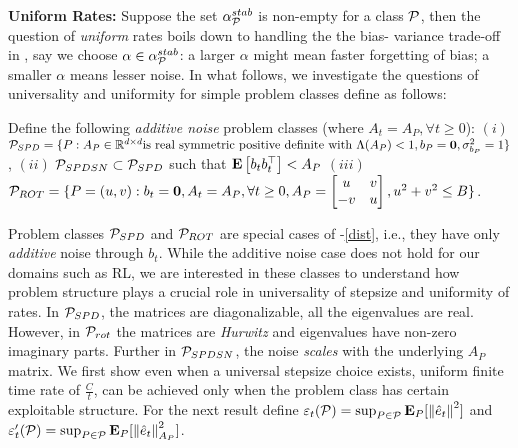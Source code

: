 \textbf{Uniform Rates:} Suppose the set $\alpha^{stab}_{\P}$ is non-empty for a class $\P$, then the question of \emph{uniform} rates boils down to handling the the bias-
variance trade-off in , say we choose $\alpha\in\alpha^{stab}_{\P}$: a larger $\alpha$ might mean faster forgetting of bias; a smaller $\alpha$ means lesser noise. In what follows, we investigate the questions of universality and uniformity for simple problem classes define as follows:
\begin{definition}
Define the following \emph{additive noise} problem classes (where $A_t=A_P,\forall t\geq 0$): $(i)$  $\P_{SPD}=\{ P: A_P\in \R^{\dcd}\text{is real symmetric positive definite with~} \Lambda(A_P)<1, b_P=\mathbf{0}, \sigma^2_{b_P}=1\}$, $(ii)$ $\P_{SPDSN}\subset \P_{SPD}$ such that $\EE{b_tb_t^\top}<A_P$ $(iii)$ $\P_{ROT}=\{P=(u,v): b_t=\mathbf{0}, A_t=A_P, \forall t\geq 0, A_P=\left[\begin{matrix} u &v \\ -v & u\end{matrix}\right], u^2+v^2\leq B\}$.
\end{definition}
Problem classes $\P_{SPD}$ and $\P_{ROT}$ are special cases of -\eqref{dist}, i.e., they have only \emph{additive} noise through $b_t$. While the additive noise case does not hold for our domains such as RL, we are interested in these classes to understand how problem structure plays a crucial role in universality of stepsize and uniformity of rates. In $\P_{SPD}$, the matrices are diagonalizable, all the eigenvalues are real. However, in $\P_{rot}$ the matrices are \emph{Hurwitz} and eigenvalues have non-zero imaginary parts. Further in $\P_{SPDSN}$, the noise \emph{scales} with the underlying $A_P$ matrix. 
We first show even when a universal stepsize choice exists, uniform finite time rate of $\frac{C}{t}$, can be achieved only when the problem class has certain exploitable structure.
\fi
For the next result define
$\eps_t(\cP) = \sup_{P\in \cP} \E_P[\norm{\eh_t}^2]$ and
$\eps_t'(\cP) = \sup_{P\in \cP}\E_P[\norm{\eh_t}^2_{A_P}]$.
